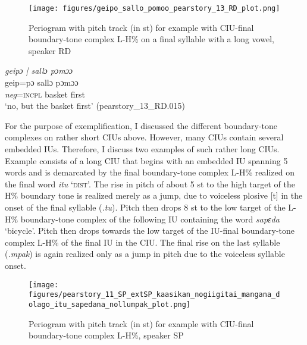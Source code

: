 \begin{figure}
	\texttt{[image: figures/geipo\_sallo\_pomoo\_pearstory\_13\_RD\_plot.png]}
	\caption{Periogram with pitch track (in st) for example  with CIU-final boundary-tone complex L-H\% on a final syllable with a  long vowel, speaker RD}
	\label{pitch:geipo sallo pomoo}
\end{figure}


\ea
\label{ex:geipo sallo pomoo}
\textit{geipɔ | sallɔ pɔmɔɔ} \\
\gll geip=pɔ sallɔ pɔmɔɔ \\
\textsl{neg}\textsc{=incpl} basket first \\ 
\glt ‘no, but the basket first’ \hfill(pearstory\_13\_RD.015)
\z





For the purpose of exemplification, I discussed the different boundary-tone complexes on rather short CIUs above. However, many CIUs contain several embedded IUs. Therefore, I discuss two examples of such rather long CIUs.  Example  consists of a long CIU that begins with an embedded IU spanning 5 words and is demarcated by the final boundary-tone complex L-H\% realized on the final word \textit{itu} ‘\textsc{dist}’. The rise in pitch of about 5 st to the high target of the H\% boundary tone is realized merely as a jump, due to voiceless plosive [t] in the onset of the final syllable (\textit{.tu}). Pitch then drops 8 st to the low target of the L-H\% boundary-tone complex of the following IU containing the word \textit{sapɛda} ‘bicycle’. Pitch then drops towards the low target of the IU-final boundary-tone complex L-H\% of the final IU in the CIU. The final rise on the last syllable (\textit{.mpak}) is again realized only as a jump in pitch due to the voiceless syllable onset.







\begin{figure}
	\texttt{[image: figures/pearstory\_11\_SP\_extSP\_kaasikan\_nogiigitai\_mangana\_dolago\_itu\_sapedana\_nollumpak\_plot.png]}
	\caption{Periogram with pitch track (in st) for example  with CIU-final boundary-tone complex L-H\%, speaker SP}
	\label{pitch:kaasikan nogiigitai mangana dolago itu sapedana nollumpak}
\end{figure}



